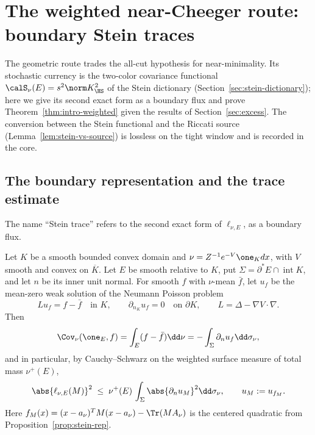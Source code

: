 \documentclass[../../main.tex]{subfiles}
\begin{document}
\section{The weighted near-Cheeger route: boundary Stein traces}
\label{sec:stein}

The geometric route trades the all-cut hypothesis for near-minimality. Its stochastic currency
is the two-color covariance functional $\calS_\nu(E)=s^2\norm K_\HS^2$ of the Stein dictionary
(Section~\ref{sec:stein-dictionary}); here we give its second exact form as a boundary flux and
prove Theorem~\ref{thm:intro-weighted} given the results of Section~\ref{sec:excess}. The
conversion between the Stein functional and the Riccati source
(Lemma~\ref{lem:stein-vs-source}) is lossless on the tight window and is recorded in the core.

\subsection{The boundary representation and the trace estimate}

The name ``Stein trace'' refers to the second exact form of $\ell_{\nu,E}$, as a boundary flux.

\begin{lemma}
\label{lem:boundary-rep}
Let $K$ be a smooth bounded convex domain and
$\nu=Z^{-1}e^{-V}\one_Kdx$, with $V$ smooth and convex on $\overline K$. Let $E$ be smooth
relative to $K$, put $\Sigma=\partial^*E\cap\operatorname{int}K$, and let $n$ be its inner unit
normal. For smooth $f$ with $\nu$-mean $\bar f$, let $u_f$ be the mean-zero weak solution of the
Neumann Poisson problem
\[
 Lu_f=f-\bar f\quad\text{in }K,
 \qquad \partial_{n_K}u_f=0\quad\text{on }\partial K,
 \qquad L=\Delta-\nabla V\cdot\nabla .
\]
Then
\begin{equation}\label{eq:boundary-rep}
  \Cov_\nu(\one_E,f)
  =\int_E(f-\bar f)\dd\nu
  =-\int_\Sigma \partial_nu_f\dd\sigma_\nu ,
\end{equation}
and in particular, by Cauchy--Schwarz on the weighted surface measure of total mass $\nu^+(E)$,
\begin{equation}\label{eq:trace-CS}
  \abs{\ell_{\nu,E}(M)}^2
  \;\le\;\nu^+(E)\,\int_\Sigma\abs{\partial_nu_{M}}^2\dd\sigma_\nu ,
  \qquad u_M:=u_{f_M} .
\end{equation}
Here $f_M(x)=(x-a_\nu)^TM(x-a_\nu)-\Tr(MA_\nu)$ is the centered quadratic from
Proposition~\ref{prop:stein-rep}.
\end{lemma}
\end{document}
